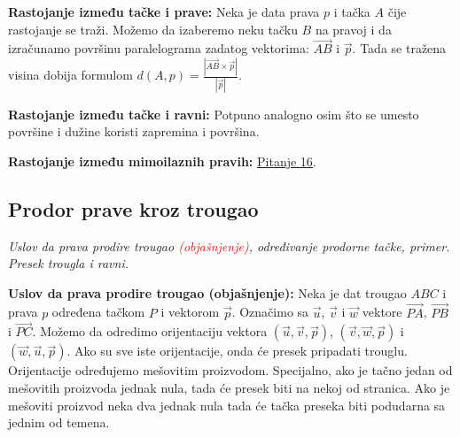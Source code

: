 \documentclass[12pt]{article}
\newcommand{\vek}[1]{\overrightarrow{#1}}
\newcommand{\ocena}[1]{\textcolor{red}{#1}}
\begin{document}
\textbf{Rastojanje između tačke i prave:} Neka je data prava $p$ i tačka $A$
čije rastojanje se traži. Možemo da izaberemo neku tačku $B$ na pravoj i da
izračunamo površinu paralelograma zadatog vektorima: $\vek{AB}$ i $\vek{p}$.
Tada se tražena visina dobija formulom
$d(A,p)=\frac{|\vek{AB}\times\vek{p}|}{|\vek{p}|}$.
\par
\textbf{Rastojanje između tačke i ravni:} Potpuno analogno osim što se umesto
površine i dužine koristi zapremina i površina.
\par

\textbf{Rastojanje između mimoilaznih pravih:}
\hyperref[subsec:pitanje_16]{Pitanje 16}.

\subsection{Prodor prave kroz trougao}
\textit{Uslov da prava prodire trougao \ocena{(objašnjenje)}, određivanje prodorne
    tačke, primer. Presek trougla i ravni.}
\par
\vspace*{1cm}

\textbf{Uslov da prava prodire trougao (objašnjenje):} Neka je dat trougao
$ABC$ i prava $p$ određena tačkom $P$ i vektorom $\vek{p}$. Označimo sa
$\vek{u}$, $\vek{v}$ i $\vek{w}$ vektore $\vek{PA}$, $\vek{PB}$ i $\vek{PC}$.
Možemo da odredimo orijentaciju vektora $(\vek{u},\vek{v},\vek{p})$,
$(\vek{v},\vek{w},\vek{p})$ i $(\vek{w},\vek{u},\vek{p})$. Ako su sve iste
orijentacije, onda će presek pripadati trouglu. Orijentacije određujemo
mešovitim proizvodom. Specijalno, ako je tačno jedan od mešovitih proizvoda
jednak nula, tada će presek biti na nekoj od stranica. Ako je mešoviti proizvod
neka dva jednak nula tada će tačka preseka biti podudarna sa jednim od temena.
\par
\end{document}
